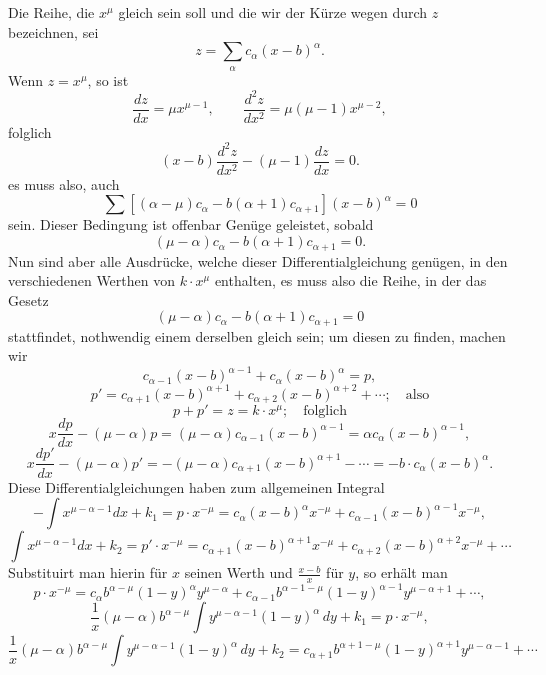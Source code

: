 \documentclass[12pt,a4paper]{article}
\begin{document}
Die Reihe, die $x^\mu$ gleich sein soll und die wir der K\"urze wegen durch $z$ bezeichnen, sei
\[
z = \sum_{\alpha} c_\alpha (x-b)^\alpha.
\]
Wenn $z = x^\mu$, so ist
\[
\frac{dz}{dx} = \mu x^{\mu-1}, \qquad \frac{d^2z}{dx^2} = \mu(\mu-1)x^{\mu-2},
\]
folglich
\[
(x-b)\frac{d^2z}{dx^2} - (\mu-1)\frac{dz}{dx} = 0.
\]
es muss also, auch
\[
\sum \left[ (\alpha - \mu)c_\alpha - b(\alpha+1)c_{\alpha+1} \right](x-b)^\alpha = 0
\]
sein. Dieser Bedingung ist offenbar Gen\"uge geleistet, sobald
\[
(\mu - \alpha)c_\alpha - b(\alpha+1)c_{\alpha+1} = 0.
\]
Nun sind aber alle Ausdr\"ucke, welche dieser Differentialgleichung gen\"ugen, in den verschiedenen Werthen von $k \cdot x^\mu$ enthalten, es muss also die Reihe, in der das Gesetz
\[
(\mu - \alpha)c_\alpha - b(\alpha+1)c_{\alpha+1} = 0
\]
stattfindet, nothwendig einem derselben gleich sein; um diesen zu finden, machen wir
\[
c_{\alpha-1}(x-b)^{\alpha-1} + c_\alpha(x-b)^\alpha = p,
\]
\[
p' = c_{\alpha+1}(x-b)^{\alpha+1} + c_{\alpha+2}(x-b)^{\alpha+2} + \cdots; \quad \text{also}
\]
\[
p + p' = z = k \cdot x^\mu; \quad \text{folglich}
\]
\[
x \frac{dp}{dx} - (\mu - \alpha)p = (\mu - \alpha)c_{\alpha-1}(x-b)^{\alpha-1} = \alpha c_\alpha(x-b)^{\alpha-1},
\]
\[
x \frac{dp'}{dx} - (\mu - \alpha)p' = -(\mu - \alpha)c_{\alpha+1}(x-b)^{\alpha+1} - \cdots = -b \cdot c_\alpha (x-b)^\alpha.
\]
Diese Differentialgleichungen haben zum allgemeinen Integral
\[
- \int x^{\mu-\alpha-1}dx + k_1 = p \cdot x^{-\mu} = c_\alpha(x-b)^\alpha x^{-\mu} + c_{\alpha-1}(x-b)^{\alpha-1}x^{-\mu},
\]
\[
\int x^{\mu-\alpha-1}dx + k_2 = p' \cdot x^{-\mu} = c_{\alpha+1}(x-b)^{\alpha+1}x^{-\mu} + c_{\alpha+2}(x-b)^{\alpha+2}x^{-\mu} + \cdots
\]
Substituirt man hierin f\"ur $x$ seinen Werth und $\frac{x-b}{x}$ f\"ur $y$, so erh\"alt man
\[
p \cdot x^{-\mu} = c_\alpha b^{\alpha-\mu}(1-y)^\alpha y^{\mu-\alpha} + c_{\alpha-1}b^{\alpha-1-\mu}(1-y)^{\alpha-1}y^{\mu-\alpha+1} + \cdots,
\]
\[
\frac{1}{x}(\mu-\alpha)b^{\alpha-\mu}\int y^{\mu-\alpha-1}(1-y)^\alpha \, dy + k_1 = p \cdot x^{-\mu},
\]
\[
\frac{1}{x}(\mu-\alpha)b^{\alpha-\mu}\int y^{\mu-\alpha-1}(1-y)^\alpha \, dy + k_2 = c_{\alpha+1}b^{\alpha+1-\mu}(1-y)^{\alpha+1}y^{\mu-\alpha-1} + \cdots
\]
\end{document}
